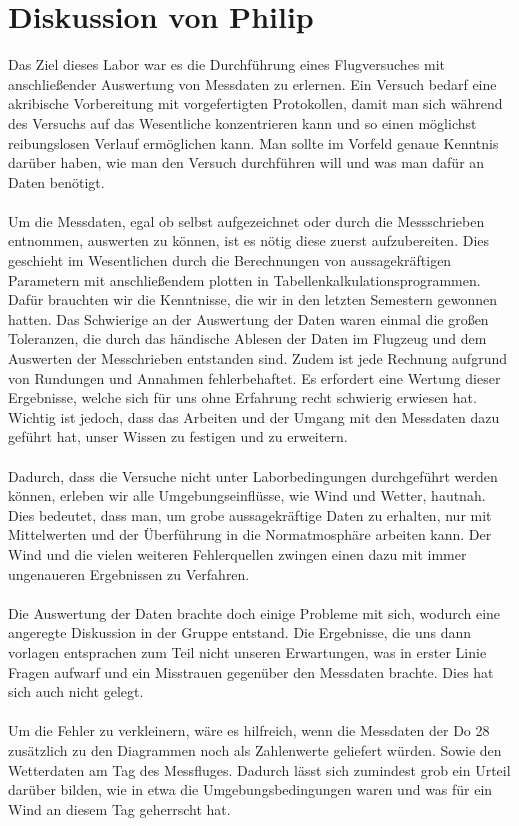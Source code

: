 \vspace{10mm}

\section{Diskussion von Philip}
Das Ziel dieses Labor war es die Durchführung eines Flugversuches mit anschließender Auswertung von Messdaten zu erlernen. Ein Versuch bedarf eine akribische Vorbereitung mit vorgefertigten Protokollen, damit man sich während des Versuchs auf das Wesentliche konzentrieren kann und so einen möglichst reibungslosen Verlauf ermöglichen kann. Man sollte im Vorfeld genaue Kenntnis darüber haben, wie man den Versuch durchführen will und was man dafür an Daten benötigt. \\\\
Um die Messdaten, egal ob selbst aufgezeichnet oder durch die Messschrieben entnommen, auswerten zu können, ist es nötig diese zuerst aufzubereiten. Dies geschieht im Wesentlichen durch die Berechnungen von aussagekräftigen Parametern mit anschließendem plotten in Tabellenkalkulationsprogrammen. Dafür brauchten wir die Kenntnisse, die wir in den letzten Semestern gewonnen hatten. Das Schwierige an der Auswertung der Daten waren einmal die großen Toleranzen, die durch das händische Ablesen der Daten im Flugzeug und dem Auswerten der Messchrieben entstanden sind. Zudem ist jede Rechnung aufgrund von Rundungen und Annahmen fehlerbehaftet. Es erfordert eine Wertung dieser Ergebnisse, welche sich für uns ohne Erfahrung recht schwierig erwiesen hat. Wichtig ist jedoch, dass das Arbeiten und der Umgang mit den Messdaten dazu geführt hat, unser Wissen zu festigen und zu erweitern.\\\\
Dadurch, dass die Versuche nicht unter Laborbedingungen durchgeführt werden können, erleben wir alle Umgebungseinflüsse, wie Wind und Wetter, hautnah. Dies bedeutet, dass man, um grobe aussagekräftige Daten zu erhalten, nur mit Mittelwerten und der Überführung in die Normatmosphäre arbeiten kann. Der Wind und die vielen weiteren Fehlerquellen zwingen einen dazu mit immer ungenaueren Ergebnissen zu Verfahren. \\\\
Die Auswertung der Daten brachte doch einige Probleme mit sich, wodurch eine angeregte Diskussion in der Gruppe entstand. Die Ergebnisse, die uns dann vorlagen entsprachen zum Teil nicht unseren Erwartungen, was in erster Linie Fragen aufwarf und ein Misstrauen gegenüber den Messdaten brachte. Dies hat sich auch nicht gelegt.
\\\\
Um die Fehler zu verkleinern, wäre es hilfreich, wenn die Messdaten der Do 28 zusätzlich zu den Diagrammen noch als Zahlenwerte geliefert würden. Sowie den Wetterdaten am Tag des Messfluges. Dadurch lässt sich zumindest grob ein Urteil darüber bilden, wie in etwa die Umgebungsbedingungen waren und was für ein Wind an diesem Tag geherrscht hat. 


